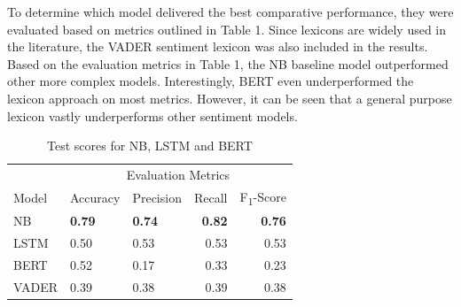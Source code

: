 \documentclass[11pt, a4paper]{article}
\begin{document}
To determine which model delivered the best comparative performance, they were evaluated based on metrics outlined in Table 1. Since lexicons are widely used in the literature,
the VADER sentiment lexicon was also included in the results.
Based on the evaluation metrics in Table 1, the NB baseline model outperformed other more complex models. Interestingly, BERT even underperformed the lexicon approach on most metrics.
However, it can be seen that a general purpose lexicon vastly underperforms other sentiment models.

\begin{table}
    \caption{Test scores for NB, LSTM and BERT}
    \label{tab:results}
    \centering
    \small

    \begin{tabular}{lllrr}
        \toprule
                                        & \multicolumn{4}{c}{Evaluation Metrics} \\
                                        \cmidrule{2-5}
                            Model       & Accuracy      & Precision     & Recall    & F\textsubscript{1}-Score \\
            \midrule
            \multirow{1}{*}{NB}         & \textbf{0.79}          & \textbf{0.74}          & \textbf{0.82}      & \textbf{0.76}                      \\
            \midrule
            \multirow{1}{*}{LSTM}       & 0.50          & 0.53          & 0.53      & 0.53                      \\
            \midrule
            \multirow{1}{*}{BERT}       & 0.52          & 0.17          & 0.33      & 0.23                      \\
            \midrule
            \multirow{1}{*}{VADER}      & 0.39          & 0.38          & 0.39      & 0.38                      \\

        \bottomrule
    \end{tabular}

\end{table}
\end{document}
